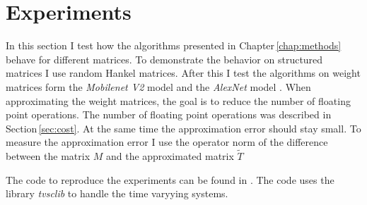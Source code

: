 \documentclass[doctype=mastersthesis,BCOR=15mm,biblatex]{ldvbook}%
\DeclareMathOperator{\length}{len}
\begin{document}


 





\chapter{Experiments}\label{chap:experiments}

In this section I test how the algorithms presented in Chapter\,\ref{chap:methods} behave for different matrices.
To demonstrate the behavior on structured matrices I use random Hankel matrices.
After this I test the algorithms on weight matrices form the \emph{Mobilenet V2} model \cite{sandler_mobilenetv2_2019} and the \emph{AlexNet} model \cite{krizhevsky_one_2014}.
When approximating the weight matrices, the goal is to reduce the number of floating point operations.
The number of floating point operations was described in Section\,\ref{sec:cost}.
At the same time the approximation error should stay small.
To measure the approximation error I use the operator norm of the difference between the matrix $M$ and the approximated matrix $\tilde{T}$

The code to reproduce the experiments can be found in .
The code uses the library \emph{tvsclib} \cite{kissel_time_2022} to handle the time varyying systems.
  
\end{document}
